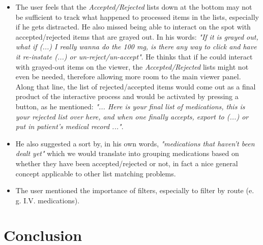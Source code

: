 \documentclass{chi2009}
\begin{document}
\begin{itemize}
\item The user feels that the \textit{Accepted/Rejected} lists down at the bottom may not be sufficient to track what happened to processed items in the lists, especially if he gets distracted. He also missed being able to interact on the spot with accepted/rejected items that are grayed out. In his words: \textit{"If it is grayed out, what if (...) I really wanna do the 100 mg, is there any way to click and have it re-instate (...) or un-reject/un-accept"}. He thinks that if he could interact with grayed-out items on the viewer, the \textit{Accepted/Rejected} lists might not even be needed, therefore allowing more room to the main viewer panel. Along that line, the list of rejected/accepted items would come out as a final product of the interactive process and would be activated by pressing a button, as he mentioned: \textit{"... Here is your final list of medications, this is your rejected list over here, and when one finally accepts, export to (...) or put in patient's medical record ..."}.
\item He also suggested a sort by, in his own words, \textit{"medications that haven't been dealt yet"} which we would translate into grouping medications based on whether they have been accepted/rejected or not, in fact a nice general concept applicable to other list matching problems.
\item The user mentioned the importance of filters, especially to filter by route (e. g. I.V. medications).  
\end{itemize}

\section{Conclusion}



\end{document}
